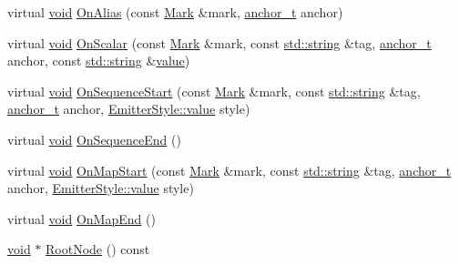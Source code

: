 \begin{DoxyCompactItemize}
\item 
virtual \mbox{\hyperlink{glad_8h_a950fc91edb4504f62f1c577bf4727c29}{void}} \mbox{\hyperlink{class_y_a_m_l_1_1_graph_builder_adapter_aa1563479f8a72f7182f0319637050eb5}{On\+Alias}} (const \mbox{\hyperlink{struct_y_a_m_l_1_1_mark}{Mark}} \&mark, \mbox{\hyperlink{namespace_y_a_m_l_abeff1798814ae3402fc5665fdcad1de6}{anchor\+\_\+t}} anchor)
\item 
virtual \mbox{\hyperlink{glad_8h_a950fc91edb4504f62f1c577bf4727c29}{void}} \mbox{\hyperlink{class_y_a_m_l_1_1_graph_builder_adapter_a74fffb942e64a1b6576368a49089c5a4}{On\+Scalar}} (const \mbox{\hyperlink{struct_y_a_m_l_1_1_mark}{Mark}} \&mark, const \mbox{\hyperlink{glad_8h_ac83513893df92266f79a515488701770}{std\+::string}} \&tag, \mbox{\hyperlink{namespace_y_a_m_l_abeff1798814ae3402fc5665fdcad1de6}{anchor\+\_\+t}} anchor, const \mbox{\hyperlink{glad_8h_ac83513893df92266f79a515488701770}{std\+::string}} \&\mbox{\hyperlink{glad_8h_a03aff08f73d7fde3d1a08e0abd8e84fa}{value}})
\item 
virtual \mbox{\hyperlink{glad_8h_a950fc91edb4504f62f1c577bf4727c29}{void}} \mbox{\hyperlink{class_y_a_m_l_1_1_graph_builder_adapter_a97a9fdfd83c8a8a52f848a561116b24f}{On\+Sequence\+Start}} (const \mbox{\hyperlink{struct_y_a_m_l_1_1_mark}{Mark}} \&mark, const \mbox{\hyperlink{glad_8h_ac83513893df92266f79a515488701770}{std\+::string}} \&tag, \mbox{\hyperlink{namespace_y_a_m_l_abeff1798814ae3402fc5665fdcad1de6}{anchor\+\_\+t}} anchor, \mbox{\hyperlink{struct_y_a_m_l_1_1_emitter_style_ae86640662c85ce6062a37f9636b6959f}{Emitter\+Style\+::value}} style)
\item 
virtual \mbox{\hyperlink{glad_8h_a950fc91edb4504f62f1c577bf4727c29}{void}} \mbox{\hyperlink{class_y_a_m_l_1_1_graph_builder_adapter_a69cada9fc86a780dc7d78c55a9b064cd}{On\+Sequence\+End}} ()
\item 
virtual \mbox{\hyperlink{glad_8h_a950fc91edb4504f62f1c577bf4727c29}{void}} \mbox{\hyperlink{class_y_a_m_l_1_1_graph_builder_adapter_ae4fff97022af791cad7e9ef834756db6}{On\+Map\+Start}} (const \mbox{\hyperlink{struct_y_a_m_l_1_1_mark}{Mark}} \&mark, const \mbox{\hyperlink{glad_8h_ac83513893df92266f79a515488701770}{std\+::string}} \&tag, \mbox{\hyperlink{namespace_y_a_m_l_abeff1798814ae3402fc5665fdcad1de6}{anchor\+\_\+t}} anchor, \mbox{\hyperlink{struct_y_a_m_l_1_1_emitter_style_ae86640662c85ce6062a37f9636b6959f}{Emitter\+Style\+::value}} style)
\item 
virtual \mbox{\hyperlink{glad_8h_a950fc91edb4504f62f1c577bf4727c29}{void}} \mbox{\hyperlink{class_y_a_m_l_1_1_graph_builder_adapter_ad117ea7f74cdef8b2bb2243e5e399f49}{On\+Map\+End}} ()
\item 
\mbox{\hyperlink{glad_8h_a950fc91edb4504f62f1c577bf4727c29}{void}} $\ast$ \mbox{\hyperlink{class_y_a_m_l_1_1_graph_builder_adapter_a69626cdd468a5b907e13cb405ed08565}{Root\+Node}} () const
\end{DoxyCompactItemize}


